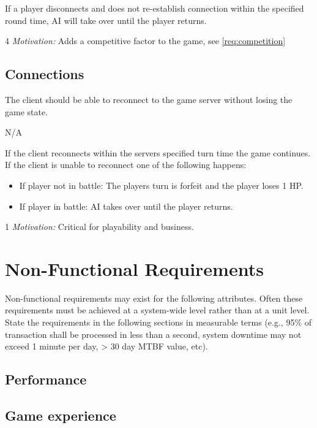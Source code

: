  If a player disconnects and does not re-establish connection within the specified round time, AI will take over until the player returns.

4 \emph{Motivation:} Adds a competitive factor to the game, see \ref{req:competition}


\stoprequirement

\subsection{Connections}

\label{req:connectionlossstall}
The client should be able to reconnect to the game server without losing the game state.

N/A

If the client reconnects within the servers specified turn time the game continues. If the client is unable to reconnect one of the following happens:
\begin{itemize} 
	\item If player not in battle: The players turn is forfeit and the player loses 1 HP.  
	\item If player in battle: AI takes over until the player returns.
\end{itemize}

1 \emph{Motivation:} Critical for playability and business.


\stoprequirement

\section{Non-Functional Requirements}
Non-functional requirements may exist for the following attributes.  Often these requirements must be achieved at a system-wide level rather than at a unit level.  State the requirements in the following sections in measurable terms (e.g., 95\% of transaction shall be processed in less than a second, system downtime may not exceed 1 minute per day, > 30 day MTBF value, etc). 
\subsection{Performance}

\subsection{Game experience}
